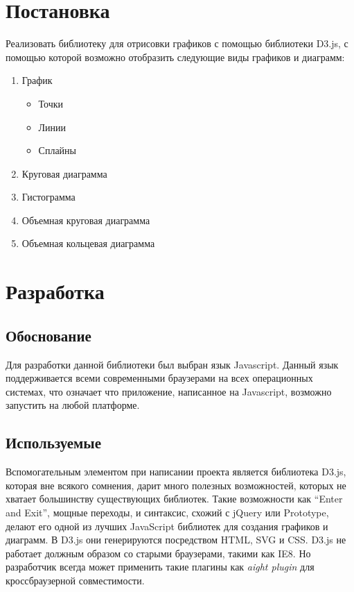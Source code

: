 \documentclass[a4paper,14pt]{extreport}
\begin{document}
\newpage
\chapter{Постановка}
\hspace{4ex}Реализовать библиотеку для отрисовки графиков с помощью библиотеки D3.js, с помощью которой возможно отобразить следующие виды графиков и диаграмм:
\begin{enumerate}
	\item График
		\begin{itemize}
		\item Точки
		\item Линии 
		\item Сплайны
		\end{itemize}
	\item Круговая диаграмма
	\item Гистограмма
	\item Объемная круговая диаграмма
	\item Объемная кольцевая диаграмма
\end{enumerate}
\newpage
\chapter{Разработка}
\section{Обоснование}
\hspace{4ex}Для разработки данной библиотеки был выбран язык Javascript. Данный язык поддерживается всеми современными браузерами на всех операционных системах, что означает что приложение, написанное на Javascript, возможно запустить на любой платформе.\\
\section{Используемые}
\hspace{4ex}Вспомогательным элементом при написании проекта является библиотека D3.js, которая вне всякого сомнения, дарит много полезных возможностей, которых не хватает большинству существующих библиотек. Такие возможности как “Enter and Exit”, мощные переходы, и синтаксис, схожий с jQuery или Prototype, делают его одной из лучших JavaScript библиотек для создания графиков и диаграмм. В D3.js они генерируются посредством HTML, SVG и CSS. D3.js не работает должным образом со старыми браузерами, такими как IE8. Но разработчик всегда может применить такие плагины как \textit{aight plugin} для кроссбраузерной совместимости.
\end{document}

